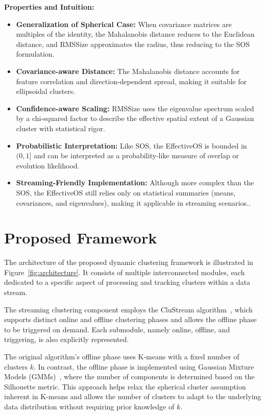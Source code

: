 \textbf{Properties and Intuition:}
\begin{itemize}
      \item \textbf{Generalization of Spherical Case:} When covariance matrices are multiples
            of the identity, the Mahalanobis distance reduces to the Euclidean distance, and
            RMSSize approximates the radius, thus reducing to the SOS formulation.
      \item \textbf{Covariance-aware Distance:} The Mahalanobis distance accounts for
            feature correlation and direction-dependent spread, making it suitable for ellipsoidal clusters.
      \item \textbf{Confidence-aware Scaling:} RMSSize uses the eigenvalue spectrum scaled
            by a chi-squared factor to describe the effective spatial extent of a Gaussian cluster
            with statistical rigor.
      \item \textbf{Probabilistic Interpretation:} Like SOS, the EffectiveOS is bounded
            in $ (0, 1] $ and can be interpreted as a probability-like measure of overlap or evolution
            likelihood.
      \item \textbf{Streaming-Friendly Implementation:} Although more complex than the SOS,
            the EffectiveOS still relies only on statistical summaries (means, covariances, and eigenvalues),
            making it applicable in streaming scenarios..
\end{itemize}

\section{Proposed Framework}\label{sec:proposed_framework}

The architecture of the proposed dynamic clustering framework is illustrated in
Figure~\ref{fig:architecture}. It consists of multiple interconnected modules,
each dedicated to a specific aspect of processing and tracking clusters within
a data stream.

The streaming clustering component employs the CluStream
algorithm~\cite{clustream}, which supports distinct online and offline
clustering phases and allows the offline phase to be triggered on demand. Each
submodule, namely online, offline, and triggering, is also explicitly
represented.

The original algorithm's offline phase uses K-means with a fixed number of
clusters $ k $. In contrast, the offline phase is implemented using Gaussian
Mixture Models (GMMs)~\cite{gaussian_mixtures}, where the number of components
is determined based on the Silhouette metric. This approach helps relax the
spherical cluster assumption inherent in K-means and allows the number of
clusters to adapt to the underlying data distribution without requiring prior
knowledge of $ k $.

